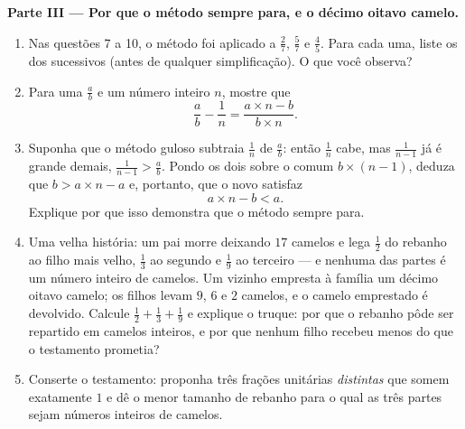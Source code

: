 \begin{problem}
\medskip
\noindent\textbf{Parte III --- Por que o método sempre para, e o
décimo oitavo camelo.}
\begin{enumerate}[resume]
  \item Nas questões 7 a 10, o método foi aplicado a $\frac27$,
        $\frac57$ e $\frac45$. Para cada uma, liste os  dos
         sucessivos (antes de qualquer simplificação). O que você
        observa?
  \item Para uma  $\frac ab$ e um número inteiro $n$, mostre que
        \[
        \frac{a}{b} - \frac{1}{n}
        = \frac{a \times n - b}{b \times n} .
        \]
  \item Suponha que o método guloso subtraia $\frac1n$ de $\frac ab$:
        então $\frac1n$ cabe, mas $\frac{1}{n-1}$ já é grande demais,
        $\frac{1}{n-1} > \frac ab$. Pondo os dois sobre o 
        comum $b \times (n - 1)$, deduza que $b > a \times n - a$ e,
        portanto, que o novo  satisfaz
        \[
        a \times n - b < a .
        \]
        Explique por que isso demonstra que o método sempre para.
  \item Uma velha história: um pai morre deixando $17$ camelos e lega
        $\frac12$ do rebanho ao filho mais velho, $\frac13$ ao segundo
        e $\frac19$ ao terceiro --- e nenhuma das partes é um número
        inteiro de camelos. Um vizinho empresta à família um décimo
        oitavo camelo; os filhos levam $9$, $6$ e $2$ camelos, e o
        camelo emprestado é devolvido. Calcule
        $\frac12 + \frac13 + \frac19$ e explique o truque: por que o
        rebanho pôde ser repartido em camelos inteiros, e por que
        nenhum filho recebeu menos do que o testamento prometia?
  \item Conserte o testamento: proponha três frações unitárias
        \emph{distintas} que somem exatamente $1$ e dê o menor tamanho
        de rebanho para o qual as três partes sejam números inteiros de
        camelos.
\end{enumerate}
\end{problem}
